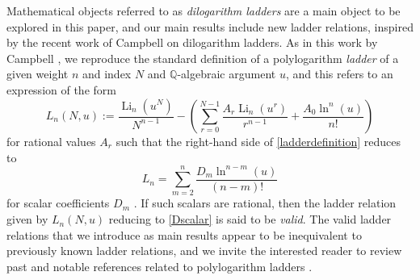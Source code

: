 \documentclass[12pt]{article}
\begin{document}
 Mathematical objects referred to as \emph{dilogarithm ladders} are a main object to be explored in this paper, and our main 
 results include new ladder relations, inspired by the recent work of Campbell \cite{Campbell2025} on dilogarithm ladders. As in this 
 work by Campbell \cite{Campbell2025}, we reproduce the standard definition of a polylogarithm \emph{ladder} of a given weight $n$ 
 and index $N$ and $\mathbb{Q}$-algebraic argument $u$, and this refers to an expression of the form 
\begin{equation}\label{ladderdefinition}
 L_{n}(N, u) := \frac{\operatorname{Li}_{n}\left( u^{N} \right)}{N^{n - 1} } - \left( \sum_{r=0}^{N-1} \frac{A_{r} 
 \operatorname{Li}_{n}\left( u^{r} \right)}{r^{n-1}} + \frac{A_{0} \ln^{n}(u)}{n!} \right) 
\end{equation}
 for rational values $A_{r}$ such that the right-hand side of \eqref{ladderdefinition} reduces to 
\begin{equation}\label{Dscalar}
 L_{n} = \sum_{m=2}^{n} \frac{ D_{m} \ln^{n-m}(u) }{(n-m)!} 
\end{equation}
 for scalar coefficients $D_{m}$ \cite[p.\ 6]{Lewin1991text}. If such scalars are rational, then the ladder relation given by $ L_{n}(N, 
 u) $ reducing to \eqref{Dscalar} is said to be \emph{valid}. The valid ladder relations that we introduce as main results appear to be 
 inequivalent to previously known ladder relations, and we invite the interested reader to review past 
 and notable references related to 
 polylogarithm ladders 
 \cite{AbouzahraLewinXiao1987,CohenLewinZagier1992,Gangl2013,Lewin1993,Lewin1986,Lewin1991collection}. 
\end{document}
